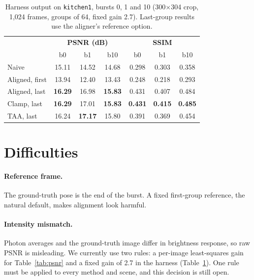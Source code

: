 \documentclass[10pt,twocolumn]{article}
\begin{document}
\begin{table}[t]
\centering
\footnotesize
\setlength{\tabcolsep}{2.6pt}
\begin{tabular}{@{}p{}ccc@{\hspace{8pt}}ccc@{}}
\toprule
 & \multicolumn{3}{c}{\textbf{PSNR (dB)}} & \multicolumn{3}{c}{\textbf{SSIM}} \\
 & b0 & b1 & b10 & b0 & b1 & b10 \\
\midrule
Naive & 15.11 & 14.52 & 14.68 & 0.298 & 0.303 & 0.358 \\
Aligned, first & 13.94 & 12.40 & 13.43 & 0.248 & 0.218 & 0.293 \\
Aligned, last & \textbf{16.29} & 16.98 & \textbf{15.83} & 0.431 & 0.407 & 0.484 \\
Clamp, last & \textbf{16.29} & 17.01 & \textbf{15.83} & \textbf{0.431} & \textbf{0.415} & \textbf{0.485} \\
TAA, last & 16.24 & \textbf{17.17} & 15.80 & 0.391 & 0.369 & 0.454 \\
\bottomrule
\end{tabular}
\caption{Harness output on \texttt{kitchen1}, bursts 0, 1 and 10 (300$\times$304 crop, 1{,}024 frames, groups of 64, fixed gain 2.7). Last-group results use the aligner's reference option.}
\label{tab:harness}
\end{table}

\section{Difficulties}
\label{sec:difficulties}

\paragraph{Reference frame.}
The ground-truth pose is the end of the burst. A fixed first-group reference, the natural default, makes alignment look harmful.

\paragraph{Intensity mismatch.}
Photon averages and the ground-truth image differ in brightness response, so raw PSNR is misleading. We currently use two rules: a per-image least-squares gain for Table~\ref{tab:psnr} and a fixed gain of 2.7 in the harness (Table~\ref{tab:harness}). One rule must be applied to every method and scene, and this decision is still open.
\end{document}
